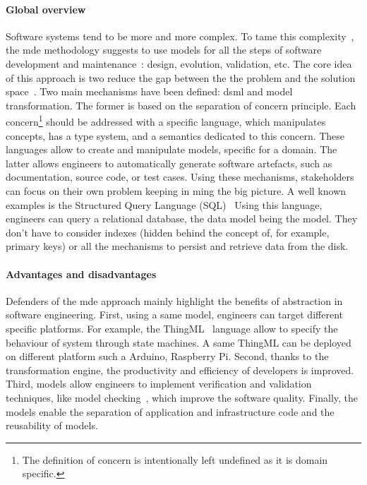 \paragraph{Global overview}    
Software systems tend to be more and more complex.
To tame this complexity~\cite{DBLP:conf/icse/FranceR07, DBLP:journals/computer/Schmidt06}, the \gls{mde} methodology suggests  to use \glspl{model} for all the steps of software development and maintenance~\cite{DBLP:journals/computer/Schmidt06, DBLP:series/synthesis/2017Brambilla, DBLP:conf/icse/HutchinsonRW11, DBLP:conf/uml/BakerLW05, DBLP:conf/icse/HutchinsonWRK11, DBLP:journals/software/AtkinsonK03a}: design, evolution, validation, etc.
The core idea of this approach is two reduce the gap between the the problem and the solution space~\cite{DBLP:journals/computer/Schmidt06}.
Two main mechanisms have been defined: \gls{dsml} and model transformation.
The former is based on the separation of concern principle.
Each concern\footnote{The definition of concern is intentionally left undefined as it is domain specific.} should be addressed with a specific language, which manipulates concepts, has a type system, and a semantics dedicated to this concern.
These languages allow to create and manipulate \glspl{model}, specific for a domain.
The latter allows engineers to automatically generate software artefacts, such as documentation, source code, or test cases.
Using these mechanisms, stakeholders can focus on their own problem keeping in ming the big picture.
A well known examples is the Structured Query Language \linebreak (SQL)~\cite{SQL:Spec}
Using this language, engineers can query a relational database, the data model being the \gls{model}.
They don't have to consider indexes (hidden behind the concept of, for example, primary keys) or all the mechanisms to persist and retrieve data from the disk.

\paragraph{Advantages and disadvantages}
Defenders of the \gls{mde} approach mainly highlight the benefits of abstraction in software engineering\cite{DBLP:journals/computer/Schmidt06, DBLP:conf/ifm/Kent02, DBLP:conf/uml/BakerLW05}.
First, using a same \gls{model}, engineers can target different specific platforms.
For example, the ThingML~\cite{DBLP:conf/models/HarrandFMH16} language allow to specify the behaviour of system through state machines.
A same ThingML can be deployed on different platform such a Arduino, Raspberry Pi.
Second, thanks to the transformation engine, the productivity and efficiency of developers is improved.
Third, \glspl{model} allow engineers to implement verification and validation techniques, like model checking~\cite{DBLP:books/daglib/0020348}, which improve the software quality.
Finally, the \glspl{model} enable the separation of application and infrastructure code and the reusability of \glspl{model}.

